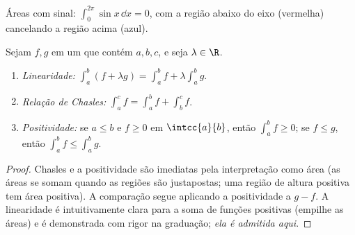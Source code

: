 \begin{omfigure}

{\small Áreas com sinal: $\int_0^{2\pi} \sin x\,\dd x = 0$, com a região
abaixo do eixo (vermelha) cancelando a região acima (azul).}
\end{omfigure}

\begin{proposition}\label{prop:g12:integ:properties}
Sejam $f, g$  em um  que contém $a, b, c$, e seja
$\lambda \in \R$.
\begin{enumerate}
  \item \emph{Linearidade:}
        $\displaystyle\int_a^b (f + \lambda g) = \int_a^b f + \lambda \int_a^b g$.
  \item \emph{Relação de Chasles:}
        $\displaystyle\int_a^c f = \int_a^b f + \int_b^c f$.
  \item \emph{Positividade:} se $a \leq b$ e $f \geq 0$ em
        $\intcc{a}{b}$, então $\displaystyle\int_a^b f \geq 0$; se
        $f \leq g$, então $\displaystyle\int_a^b f \leq \int_a^b g$.
\end{enumerate}
\end{proposition}

\begin{proof}
Chasles e a positividade são imediatas pela interpretação como área (as
áreas se somam quando as regiões são justapostas; uma região de altura
positiva tem área positiva). A comparação segue aplicando a positividade a
$g - f$. A linearidade é intuitivamente clara para a soma de funções
positivas (empilhe as áreas) e é demonstrada com rigor na graduação;
\emph{ela é admitida aqui}.
\end{proof}

